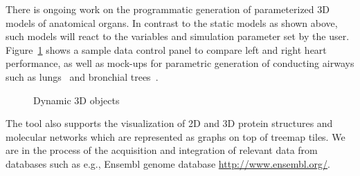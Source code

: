 There is ongoing work on the programmatic generation of parameterized 3D models of anatomical organs. In contrast to the static models as shown above, such models will react to the variables and simulation parameter set by the user. Figure~\ref{fig:simulation} shows a sample data control panel to compare left and right heart performance, as well as mock-ups for parametric generation of conducting airways such as lungs~\cite{TPH00} and bronchial trees~\cite{THT+04}.
\begin{figure}
\centering
	\centering
	\caption{Dynamic 3D objects}
	\label{fig:simulation}
\end{figure}

The tool also supports the visualization of 2D and 3D protein structures and molecular networks which are represented as graphs on top of treemap tiles.
We are in the process of the acquisition and integration of relevant data from databases such as e.g., Ensembl genome database \url{http://www.ensembl.org/}.
